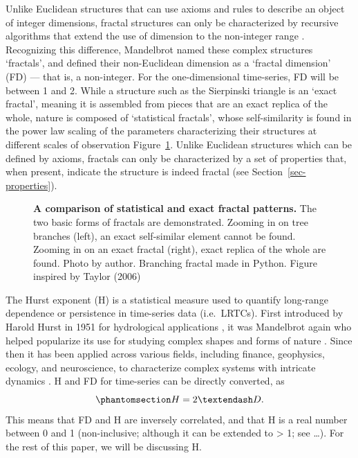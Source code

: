 \documentclass[
  sn-vancouver,
  Numbered,
  referee,
  lineno]{sn-jnl}
\begin{document}
Unlike Euclidean structures that can use axioms and rules to describe an
object of integer dimensions, fractal structures can only be
characterized by recursive algorithms that extend the use of dimension
to the non-integer range \citep{hermanFractalBranchingPattern2001}.
Recognizing this difference, Mandelbrot named these complex structures
`fractals', and defined their non-Euclidean dimension as a `fractal
dimension' (FD) --- that is, a non-integer. For the one-dimensional
time-series, FD will be between 1 and 2. While a structure such as the
Sierpinski triangle is an `exact fractal', meaning it is assembled from
pieces that are an exact replica of the whole, nature is composed of
`statistical fractals', whose self-similarity is found in the power law
scaling of the parameters characterizing their structures at different
scales of observation Figure~\ref{fig-statisticalfractal}. Unlike
Euclidean structures which can be defined by axioms, fractals can only
be characterized by a set of properties that, when present, indicate the
structure is indeed fractal (see Section~\ref{sec-properties}).

\begin{figure}


\caption{\label{fig-statisticalfractal}\textbf{A comparison of
statistical and exact fractal patterns.} The two basic forms of fractals
are demonstrated. Zooming in on tree branches (left), an exact
self-similar element cannot be found. Zooming in on an exact fractal
(right), exact replica of the whole are found. Photo by author.
Branching fractal made in Python. Figure inspired by Taylor (2006)
\citep{taylorPersonalReflectionsJackson2006}}

\end{figure}%

The Hurst exponent (H) is a statistical measure used to quantify
long-range dependence or persistence in time-series data (i.e.~LRTCs).
First introduced by Harold Hurst in 1951 for hydrological applications
\citep{hurstLongTermStorageCapacity1951}, it was Mandelbrot again who
helped popularize its use for studying complex shapes and forms of
nature
\citep{mandelbrotClasseProcessusStochastiques1965, mandelbrotHowLongCoast1967}.
Since then it has been applied across various fields, including finance,
geophysics, ecology, and neuroscience, to characterize complex systems
with intricate dynamics
\citep{molzFractionalBrownianMotion1997, korvinFractalModelsEarth1992, parkSelfSimilarNetworkTraffic2000, gravesBriefHistoryLong2017}.
H and FD for time-series can be directly converted, as
\begin{equation}\phantomsection\label{eq-HRD}{
H=2–D.
}\end{equation} This means that FD and H are inversely correlated, and
that H is a real number between 0 and 1 (non-inclusive; although it can
be extended to \textgreater{} 1; see \ldots). For the rest of this
paper, we will be discussing H.
\end{document}
